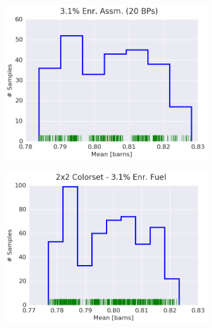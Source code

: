 \begin{figure}[h!]
\begin{subfigure}{0.5\textwidth}
  \centering
  \includegraphics[width=\linewidth]{figures/patterns/assm-3.1-20BPs/hist-kde-rug/assm-31-20BPs-capt-1}
  \caption{}
  \label{fig:chap9-hist-assm-3.1-20BPs-capt}
\end{subfigure}%
\begin{subfigure}{0.5\textwidth}
  \centering
  \includegraphics[width=\linewidth]{figures/patterns/2x2/hist-kde-rug/31-enr-capt-1}
  \caption{}
  \label{fig:chap9-hist-2x2-3.1-capt}
\end{subfigure}
\begin{subfigure}{0.5\textwidth}
  \centering

\end{subfigure}
\end{figure}

